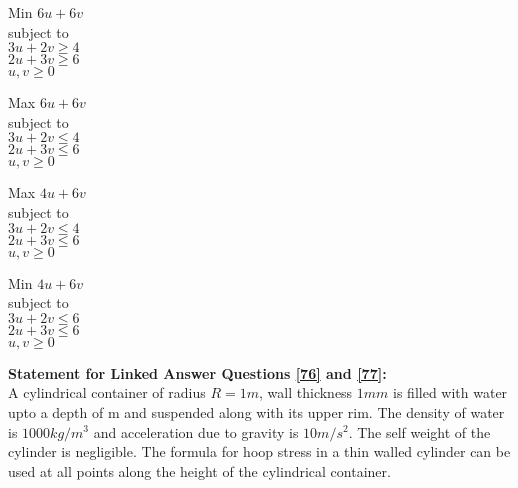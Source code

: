 \begin{enumerate}
    \begin{multicols}{2}
        \item Min $6u + 6v$ \\ subject to \\ $3u + 2v \geq 4$ \\ $2u + 3v \geq 6$ \\ $u,v \geq 0 $  
         \item Max $6u + 6v$ \\ subject to \\ $3u + 2v \leq 4$ \\ $2u + 3v \leq 6$ \\ $u,v \geq 0 $
        \item Max $4u + 6v$ \\ subject to \\ $3u + 2v \leq 4$ \\ $2u + 3v \leq 6$ \\ $u,v \geq 0 $
         \item Min $4u + 6v$ \\ subject to \\ $3u + 2v \leq 6$ \\ $2u + 3v \leq 6$ \\ $u,v \geq 0 $
    \end{multicols}
\end{enumerate}
\textbf{Statement for Linked Answer Questions \ref{76} and \ref{77}:} \\ A cylindrical container of radius $R = 1m$, wall thickness 
$1 mm$ is filled with water upto a depth of 
m and suspended along with its upper rim. The density of water is $1000kg/m^3$ and acceleration due to gravity is $10m/s^2$. The self weight of the cylinder is negligible. The formula for hoop stress in a thin walled cylinder can be used at all points along the height of the cylindrical container. \\
